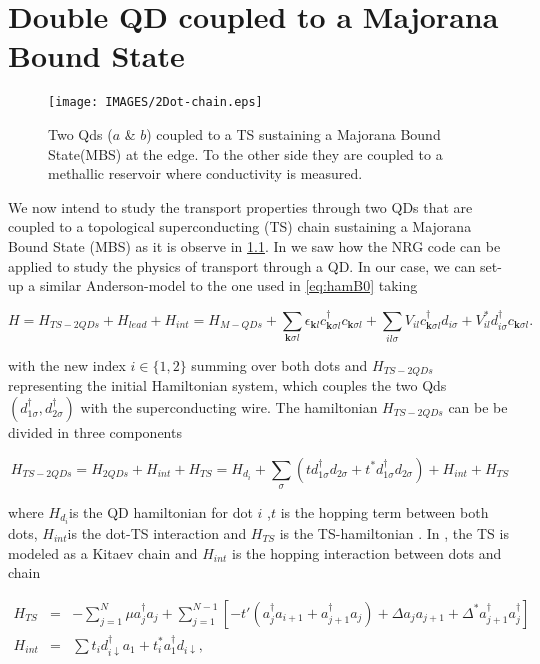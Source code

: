 \chapter{Double QD coupled to a Majorana Bound State}

\begin{figure}[bh]
\texttt{[image: IMAGES/2Dot-chain.eps]}\caption{\label{Fig_2QD-Majorana} Two Qds ($a$ \& $b$) coupled to a TS sustaining
a Majorana Bound State(MBS) at the edge. To the other side they are
coupled to a methallic reservoir where conductivity is measured. }


\end{figure}


We now intend to study the transport properties through two QDs that
are coupled to a topological superconducting (TS) chain sustaining
a Majorana Bound State (MBS) as it is observe in \ref{Fig_2QD-Majorana}.
In  we saw how the NRG
code can be applied to study the physics of transport through a QD.
In our case, we can set-up a similar Anderson-model to the one used
in \ref{eq:hamB0} taking

\[
H=H_{TS-2QDs}+H_{lead}+H_{int}=H_{M-QDs}+\sum_{\mathbf{k}\sigma l}\epsilon_{\mathbf{k}l}c_{\mathbf{k}\sigma l}^{\dagger}c_{\mathbf{k}\sigma l}+\sum_{il\sigma}V_{il}c_{\mathbf{k}\sigma l}^{\dagger}d_{i\sigma}+V_{il}^{*}d_{i\sigma}^{\dagger}c_{\mathbf{k}\sigma l}.
\]


with the new index $i\in\{1,2\}$ summing over both dots and $H_{TS-2QDs}$
representing the initial Hamiltonian system, which couples the two
Qds $\left(d_{1\sigma}^{\dagger},d_{2\sigma}^{\dagger}\right)$ with
the superconducting wire. The hamiltonian $H_{TS-2QDs}$ can be be
divided in three components

\[
H_{TS-2QDs}=H_{2QDs}+H_{int}+H_{TS}=H_{d_{i}}+\sum_{\sigma}\left(td_{1\sigma}^{\dagger}d_{2\sigma}+t^{*}d_{1\sigma}^{\dagger}d_{2\sigma}\right)+H_{int}+H_{TS}
\]


where $H_{d_{i}}$is the QD hamiltonian for dot $i$ 
,$t$ is the hopping term between both dots, $H_{int}$is the dot-TS
interaction and $H_{TS}$ is the TS-hamiltonian . In \citep{vernek_subtle_2014},
the TS is modeled as a Kitaev chain \citep{kitaev_unpaired_2001}
and $H_{int}$ is the hopping interaction between dots and chain 

\begin{eqnarray}
H_{TS} & = & -\sum_{j=1}^{N}\mu a_{j}^{\dagger}a_{j}+\sum_{j=1}^{N-1}\left[-t'(a_{j}^{\dagger}a_{i+1}+a_{j+1}^{\dagger}a_{j})+\Delta a_{j}a_{j+1}+\Delta^{*}a_{j+1}^{\dagger}a_{j}^{\dagger}\right]\nonumber \\
H_{int} & = & \sum t_{i}d_{i\downarrow}^{\dagger}a_{1}+t_{i}^{*}a_{1}^{\dagger}d_{i\downarrow},\label{eq:Kitaev-dot}
\end{eqnarray}


